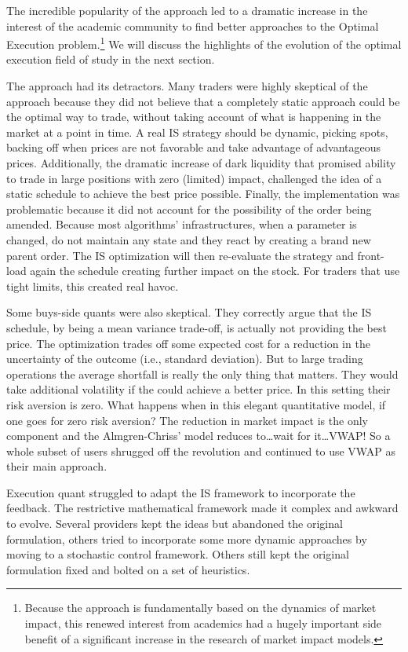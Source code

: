 The incredible popularity of the approach led to a dramatic increase in the interest of the academic community to find better approaches to the Optimal Execution problem.\footnote{Because the approach is fundamentally based on the dynamics of market impact, this renewed interest from academics had  a hugely important side benefit of a significant increase in the research of market impact models.} We will discuss the highlights of the evolution of the optimal execution field of study in the next section.


The approach had its detractors. Many traders were highly skeptical of the approach because they did not believe that a completely static approach could be the optimal way to trade, without taking account of what is happening in the market at a point in time. A real IS strategy should be dynamic, picking spots, backing off when prices are not favorable and take advantage of advantageous prices.  Additionally, the dramatic increase of dark liquidity that promised ability to trade in large positions with zero (limited) impact, challenged the idea of a static schedule to achieve the best price possible. Finally, the implementation was problematic because it did not account for the possibility of the order being amended. Because most algorithms' infrastructures, when a parameter is changed, do not maintain any state and they react by creating a brand new parent order. The IS optimization will then re-evaluate the strategy and front-load again the schedule creating further impact on the stock. For traders that use tight limits, this created real havoc.


Some buys-side quants were also skeptical. They correctly argue that the IS schedule, by being a mean variance trade-off, is actually not providing the best price. The optimization trades off some expected cost for a reduction in the uncertainty of the outcome (i.e., standard deviation). But to large trading operations the average shortfall is really the only thing that matters. They would take additional volatility if the could achieve a better price. In this setting their risk aversion is zero. What happens when in this elegant quantitative model, if one goes for zero risk aversion? The reduction in market impact is the only component and the Almgren-Chriss' model reduces to\dots  wait for it\dots VWAP! So a whole subset of users shrugged off the revolution and continued to use VWAP as their main approach.


Execution quant struggled to adapt the IS framework to incorporate the feedback. The restrictive mathematical framework made it complex and awkward to evolve. Several providers kept the ideas but abandoned the original formulation, others tried to incorporate some more dynamic approaches by moving to a stochastic control framework. Others still kept the original formulation fixed and bolted on a set of heuristics.


